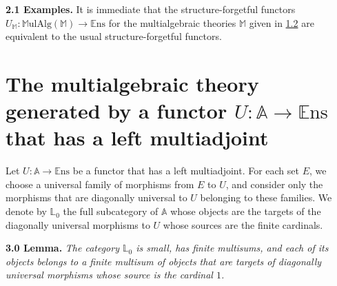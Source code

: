 \documentclass{article}
\newenvironment{itenv}[1]
  {\phantomsection\par\medskip\noindent\textbf{#1.}\itshape}
  {\medskip}
\newenvironment{rmenv}[1]
  {\phantomsection\par\medskip\noindent\textbf{#1.}\rmfamily}
  {\medskip}
\newcommand{\bb}[1]{{\mathbb{#1}}}
\newcommand{\Set}{\mathbb{E}\mathrm{ns}}
\newcommand{\MulAlg}{\mathbb{M}\mathrm{ulAlg}}
\begin{document}
\begin{rmenv}{2.1 Examples}
\label{2.1}
  It is immediate that the structure-forgetful functors $U_\bb{M}\colon\MulAlg(\bb{M})\to\Set$ for the multialgebraic theories $\bb{M}$ given in \hyperref[1.2]{1.2} are equivalent to the usual structure-forgetful functors.
\end{rmenv}



\section{The multialgebraic theory generated by a functor \texorpdfstring{$U\colon\bb{A}\to\Set$}{U:A->Set} that has a left multiadjoint}
\label{3}

Let $U\colon\bb{A}\to\Set$ be a functor that has a left multiadjoint.
For each set $E$, we choose a universal family of morphisms from $E$ to $U$, and consider only the morphisms that are diagonally universal to $U$ belonging to these families.
We denote by $\bb{L}_0$ the full subcategory of $\bb{A}$ whose objects are the targets of the diagonally universal morphisms to $U$ whose sources are the finite cardinals.

\begin{itenv}{3.0 Lemma}
\label{3.0}
  The category $\bb{L}_0$ is small, has finite multisums, and each of its objects belongs to a finite multisum of objects that are targets of diagonally universal morphisms whose source is the cardinal $1$.
\end{itenv}
\end{document}
